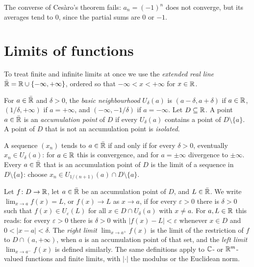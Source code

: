 \begin{counterexample}\label{real-analysis:counterexample-cesaro-converse}
The converse of Ces\`aro's theorem fails: $a_n = (-1)^n$ does not converge, but its averages tend to $0$, since the partial sums are $0$ or $-1$.
\end{counterexample}

\section{Limits of functions}\label{real-analysis:section-limits-functions}

To treat finite and infinite limits at once we use the \emph{extended real line} $\bar{\mathbb{R}} = \mathbb{R} \cup \{-\infty, +\infty\}$, ordered so that $-\infty < x < +\infty$ for $x \in \mathbb{R}$.

\begin{definition}\label{real-analysis:definition-neighbourhoods}
For $a \in \bar{\mathbb{R}}$ and $\delta > 0$, the \emph{basic neighbourhood} $U_\delta(a)$ is $(a - \delta, a + \delta)$ if $a \in \mathbb{R}$, $(1/\delta, +\infty)$ if $a = +\infty$, and $(-\infty, -1/\delta)$ if $a = -\infty$. Let
$D \subseteq \mathbb{R}$. A point $a \in \bar{\mathbb{R}}$ is an \emph{accumulation point} of $D$ if every $U_\delta(a)$ contains a point of $D \setminus \{a\}$. A point of $D$ that is not an accumulation point is \emph{isolated}.
\end{definition}

A sequence $(x_n)$ tends to $a \in \bar{\mathbb{R}}$ if and only if for every $\delta > 0$, eventually $x_n \in U_\delta(a)$: for $a \in \mathbb{R}$ this is convergence, and for $a = \pm\infty$ divergence to $\pm\infty$. Every $a \in \bar{\mathbb{R}}$
that is an accumulation point of $D$ is the limit of a sequence in $D \setminus \{a\}$: choose $x_n \in U_{1/(n+1)}(a) \cap D \setminus \{a\}$.

\begin{definition}\label{real-analysis:definition-function-limit}
Let $f \colon D \to \mathbb{R}$, let $a \in \bar{\mathbb{R}}$ be an accumulation point of $D$, and $L \in \bar{\mathbb{R}}$. We write $\lim_{x \to a}f(x) = L$, or $f(x) \to L$ as $x \to a$, if for every $\varepsilon > 0$ there is $\delta > 0$ such that
$f(x) \in U_\varepsilon(L)$ for all $x \in D \cap U_\delta(a)$ with $x \neq a$. For $a, L \in \mathbb{R}$ this reads: for every $\varepsilon > 0$ there is $\delta > 0$ with $|f(x) - L| < \varepsilon$ whenever $x \in D$ and
$0 < |x - a| < \delta$. The \emph{right limit} $\lim_{x \to a^+}f(x)$ is the limit of the restriction of $f$ to $D \cap (a, +\infty)$, when $a$ is an accumulation point of that set, and the \emph{left limit}
$\lim_{x \to a^-}f(x)$ is defined similarly. The same definitions apply to $\mathbb{C}$- or $\mathbb{R}^m$-valued functions and finite limits, with $|\cdot|$ the modulus or the Euclidean norm.
\end{definition}

